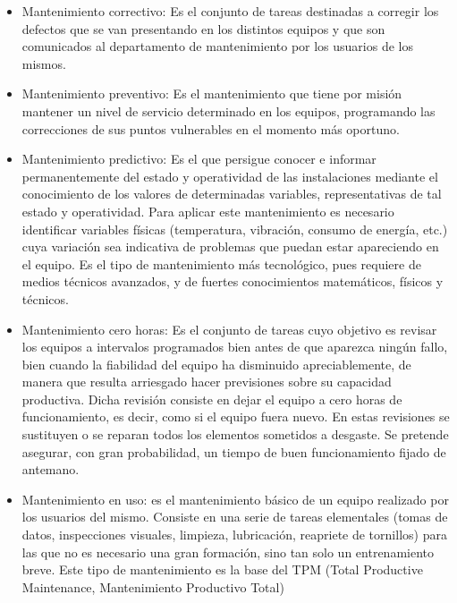 \documentclass[../main]{subfiles}
\begin{document}
\begin{itemize}
\item Mantenimiento correctivo: Es el conjunto de tareas destinadas a corregir los defectos que se van presentando en los distintos equipos y
que son comunicados al departamento de mantenimiento por los
usuarios de los mismos.
\item Mantenimiento preventivo: Es el mantenimiento que tiene por misión
mantener un nivel de servicio determinado en los equipos, programando las correcciones de sus puntos vulnerables en el momento
más oportuno.
\item Mantenimiento predictivo: Es el que persigue conocer e informar permanentemente del estado y operatividad de las instalaciones mediante
el conocimiento de los valores de determinadas variables, representativas de tal estado y operatividad. Para aplicar este mantenimiento es
necesario identificar variables físicas (temperatura, vibración, consumo
de energía, etc.) cuya variación sea indicativa de problemas que puedan
estar apareciendo en el equipo. Es el tipo de mantenimiento más tecnológico, pues requiere de medios técnicos avanzados, y de fuertes conocimientos matemáticos, físicos y técnicos.
\item Mantenimiento cero horas: Es el conjunto de tareas cuyo objetivo es revisar los equipos a intervalos programados bien antes de que aparezca
ningún fallo, bien cuando la fiabilidad del equipo ha disminuido apreciablemente, de manera que resulta arriesgado hacer previsiones sobre
su capacidad productiva. Dicha revisión consiste en dejar el equipo a
cero horas de funcionamiento, es decir, como si el equipo fuera nuevo.
En estas revisiones se sustituyen o se reparan todos los elementos sometidos a desgaste. Se pretende asegurar, con gran probabilidad, un
tiempo de buen funcionamiento fijado de antemano.
\item Mantenimiento en uso: es el mantenimiento básico de un equipo realizado por los usuarios del mismo. Consiste en una serie de tareas elementales (tomas de datos, inspecciones visuales, limpieza, lubricación, reapriete de tornillos) para las que no es necesario una gran
formación, sino tan solo un entrenamiento breve. Este tipo de mantenimiento es la base del TPM (Total Productive Maintenance, Mantenimiento Productivo Total)
\end{itemize}
\end{document}
